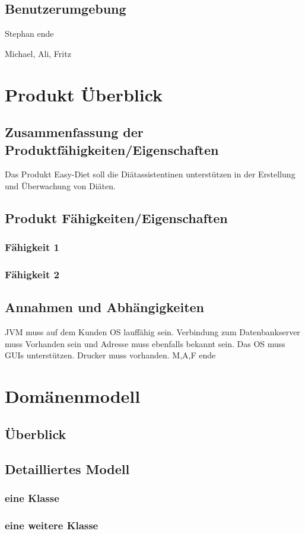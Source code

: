 \documentclass{article}
\begin{document}
\subsection{Benutzerumgebung}
Stephan ende

Michael, Ali, Fritz
\section{Produkt Überblick}
\subsection{Zusammenfassung der Produktfähigkeiten/Eigenschaften}
Das Produkt Easy-Diet soll die Diätassistentinen unterstützen in der Erstellung und Überwachung von Diäten.
\subsection{Produkt Fähigkeiten/Eigenschaften}
\subsubsection{Fähigkeit 1}
\subsubsection{Fähigkeit 2}
\subsection{Annahmen und Abhängigkeiten}
JVM muss auf dem Kunden OS lauffähig sein.
Verbindung zum Datenbankserver muss Vorhanden sein und Adresse muss ebenfalls bekannt sein.
Das OS muss GUIs unterstützen.
Drucker muss vorhanden.
M,A,F ende

\section{Domänenmodell}
\subsection{Überblick}
\subsection{Detailliertes Modell}
\subsubsection{eine Klasse}
\subsubsection{eine weitere Klasse}
\end{document}
